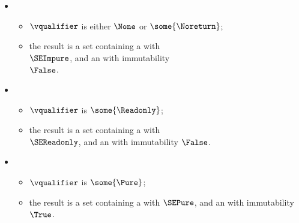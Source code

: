 \ProseParagraph
\OneApplies
\begin{itemize}
  \item {}
  \begin{itemize}
    \item $\vqualifier$ is either $\None$ or $\some{\Noreturn}$;
    \item the result is a set containing a \GlobalEffectTerm{} with \purity{} \\ $\SEImpure$, and an \ImmutabilityTerm{}
          with immutability \\ $\False$.
  \end{itemize}

  \item {}
  \begin{itemize}
    \item $\vqualifier$ is $\some{\Readonly}$;
    \item the result is a set containing a \GlobalEffectTerm{} with \purity{} \\ $\SEReadonly$, and an \ImmutabilityTerm{} with immutability $\False$.
  \end{itemize}

  \item {}
  \begin{itemize}
    \item $\vqualifier$ is $\some{\Pure}$;
    \item the result is a set containing a \GlobalEffectTerm{} with \purity{} $\SEPure$, and an \ImmutabilityTerm{} with immutability $\True$.
  \end{itemize}
\end{itemize}

\FormallyParagraph
\begin{mathpar}
\end{mathpar}

\begin{mathpar}
\end{mathpar}

\begin{mathpar}
\end{mathpar}
